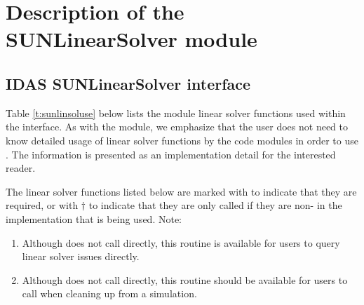 \chapter{Description of the SUNLinearSolver module}\label{s:sunlinsol}



\section{IDAS SUNLinearSolver interface}
\label{s:sunlinsol_interface}

Table \ref{t:sunlinsoluse} below lists the {\sunlinsol} module linear solver
functions used within the {\idals} interface. As with the {\sunmatrix} module, we
emphasize that the {\ida} user does not need to know detailed usage of linear
solver functions by the {\ida} code modules in order to use {\ida}. The
information is presented as an implementation detail for the interested reader.

The linear solver functions listed below are marked with \cm to
indicate that they are required, or with $\dagger$ to indicate that
they are only called if they are non- in the {\sunlinsol}
implementation that is being used. Note:
\begin{enumerate}
\item Although {\idals} does not call 
  directly, this routine is available for users to query linear solver
  issues directly.
\item Although {\idals} does not call 
  directly, this routine should be available for users to call when
  cleaning up from a simulation.
\end{enumerate}

